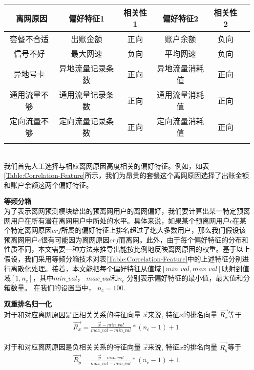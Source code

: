 \begin{tabular}{cccccc}
	\toprule
	\ 离网原因 & 偏好特征1 & 相关性1 & 偏好特征2 & 相关性2 \\
	\midrule
	套餐不合适 & 出账金额 & 正向 & 账户余额 & 负向  \\
	信号不好 & 最大网速  & 负向 & 平均网速  & 负向 \\
	异地号卡 & 异地流量记录条数 & 正向 & 异地流量消耗值 & 正向 \\
	通用流量不够 & 通用流量记录条数 & 正向 & 通用流量消耗值 & 正向 \\
	定向流量不够 & 定向流量记录条数 & 正向 & 定向流量消耗值 & 正向 \\
	\bottomrule
	\label{Table:Correlation-Feature}
\end{tabular}
\\

我们首先人工选择与相应离网原因高度相关的偏好特征。例如，如表\ref{Table:Correlation-Feature}所示，我们为昂贵的套餐这个离网原因选择了出账金额和账户余额这两个偏好特征。

\textbf{等频分箱}\\

为了表示离网预测模块给出的预离网用户的离网偏好，我们要计算出某一特定预离网用户在所有潜在离网用户中所处的水平。具体来说，如果某个预离网用户$c$在某个特定离网原因$crf$所属的偏好特征上排名超过了绝大多数用户，那么我们假设该预离网用户$c$很有可能因为离网原因$crf$而离网。此外，由于每个偏好特征的分布和性质不同，本文需要一种方法来推导出能按比例地反映离网原因的权重。基于以上假设，我们采用等频分箱技术对表\ref{Table:Correlation-Feature}中的上述特征分别进行离散化处理。接着，本文能把每个偏好特征从值域$[min\_val, max\_val]$映射到值域$[1, n_{c}]$，其中$min\_val$， $max\_val$和$n_{c}$ 分别表示偏好特征的最小值，最大值和分箱数量。 在我们的设置当中， $n_{c} = 100$.

\textbf{双重排名归一化}\\

对于和对应离网原因是正相关关系的特征向量 $\vec{x}$来说, 特征$x$的排名向量 $\overrightarrow{R_x}$等于
\begin{equation}
	\begin{aligned}
		\overrightarrow{R_x} = \frac{\vec{x}-min\_val}{max\_val-min\_val}*(n_{c} - 1) + 1.
	\end{aligned}
	\label{Eq:Postive-Binning}
\end{equation}	

对于和对应离网原因是负相关关系的特征向量 $\vec{x}$来说, 特征$x$的排名向量 $\overrightarrow{R_y}$等于
\begin{equation}
	\begin{aligned}
		\overrightarrow{R_y} = \frac{\vec{y}-min\_val}{max\_val-min\_val}*(n_{c} - 1) + 1.
	\end{aligned}
	\label{Eq:Negative-Binning}
\end{equation}	

